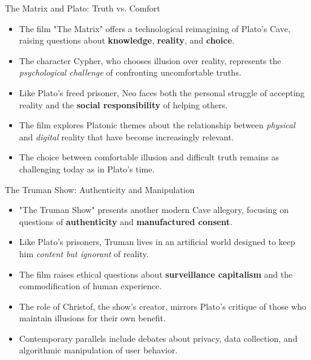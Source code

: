 \documentclass[aspectratio=169]{beamer}
\begin{document}
\begin{frame}{The Matrix and Plato: Truth vs. Comfort}
\begin{itemize}
\item The film "The Matrix" offers a technological reimagining of Plato's Cave, raising questions about \textbf{knowledge}, \textbf{reality}, and \textbf{choice}.
\item The character Cypher, who chooses illusion over reality, represents the \emph{psychological challenge} of confronting uncomfortable truths.
\item Like Plato's freed prisoner, Neo faces both the personal struggle of accepting reality and the \textbf{social responsibility} of helping others.
\item The film explores Platonic themes about the relationship between \emph{physical} and \emph{digital} reality that have become increasingly relevant.
\item The choice between comfortable illusion and difficult truth remains as challenging today as in Plato's time.
\end{itemize}
\end{frame}

\begin{frame}{The Truman Show: Authenticity and Manipulation}
\begin{itemize}
\item "The Truman Show" presents another modern Cave allegory, focusing on questions of \textbf{authenticity} and \textbf{manufactured consent}.
\item Like Plato's prisoners, Truman lives in an artificial world designed to keep him \emph{content but ignorant} of reality.
\item The film raises ethical questions about \textbf{surveillance capitalism} and the commodification of human experience.
\item The role of Christof, the show's creator, mirrors Plato's critique of those who maintain illusions for their own benefit.
\item Contemporary parallels include debates about privacy, data collection, and algorithmic manipulation of user behavior.
\end{itemize}
\end{frame}
\end{document}
